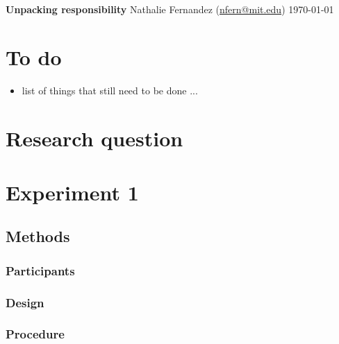 \documentclass[11pt]{article}
\begin{document}
\begin{center} 
{\LARGE \textbf{Unpacking responsibility}}
\linebreak
\linebreak
{\large Nathalie Fernandez (\href{mailto:nfern@mit.edu}{nfern@mit.edu})}
\linebreak
\today
\end{center} 

\tableofcontents 
\clearpage 

\section{To do}
\label{sec:to_do}

\begin{itemize}
	\item list of things that still need to be done ... 
\end{itemize}

\clearpage 
\section{Research question}
\label{sec:research_question}

\section{Experiment 1}
\label{sec:experiment_1}

\subsection{Methods}
\label{sub:methods}

\subsubsection{Participants}
\label{ssub:participants}

\subsubsection{Design}
\label{ssub:design}

\subsubsection{Procedure}
\label{ssub:procedure}
\end{document}
